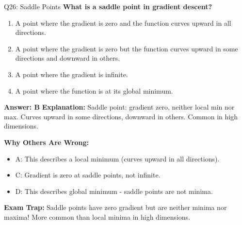\documentclass[8pt]{beamer}
\begin{document}
	\begin{frame}{Q26: Saddle Points}
		\fontsize{6.5}{7.5}\selectfont
		\textbf{What is a saddle point in gradient descent?}
		
		\begin{enumerate}
			\item A point where the gradient is zero and the function curves upward in all directions.
			\item A point where the gradient is zero but the function curves upward in some directions and downward in others.
			\item A point where the gradient is infinite.
			\item A point where the function is at its global minimum.
		\end{enumerate}
		
		\vspace{0.05cm}
		\textcolor{myblue}{\textbf{Answer: B}}
		\vspace{0.05cm}
		\textcolor{myblue}{\textbf{Explanation:}} Saddle point: gradient zero, neither local min nor max. Curves upward in some directions, downward in others. Common in high dimensions.
		
		\vspace{0.05cm}
		\textcolor{myred}{\textbf{Why Others Are Wrong:}}
		\begin{itemize}
			\item \textcolor{myred}{A:} This describes a local minimum (curves upward in all directions).
			\item \textcolor{myred}{C:} Gradient is zero at saddle points, not infinite.
			\item \textcolor{myred}{D:} This describes global minimum - saddle points are not minima.
		\end{itemize}
		
		\textcolor{myred}{\textbf{Exam Trap:}} Saddle points have \textcolor{myblue}{zero gradient} but are neither minima nor maxima! More common than local minima in high dimensions.
	\end{frame}
	
\end{document}
